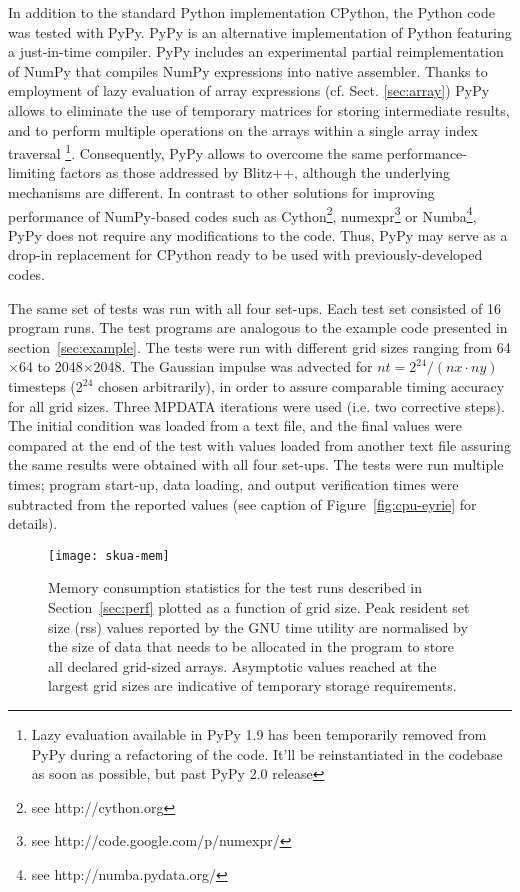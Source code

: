 \documentclass[final,5p,times,twocolumn]{elsarticle}
\newcommand{\url}[1]{{#1}}
\begin{document}
  In addition to the standard Python implementation CPython,
    the Python code was tested with PyPy.
  PyPy is an alternative implementation of Python featuring a just-in-time compiler. 
  PyPy includes an experimental partial reimplementation of NumPy that compiles NumPy expressions into native assembler.
  Thanks to employment of lazy evaluation of array expressions (cf. Sect. \ref{sec:array})
    PyPy allows to eliminate the use of temporary matrices for storing intermediate results,
    and to perform multiple operations on the arrays within a single array index traversal
    \footnote{Lazy evaluation available in PyPy 1.9 has been temporarily removed from PyPy during a refactoring of
      the code. It'll be reinstantiated in the codebase as soon as possible, but past PyPy 2.0 release}.
  Consequently, PyPy allows to overcome the same performance-limiting factors as those addressed by Blitz++, although 
    the underlying mechanisms are different.
  In contrast to other solutions for improving performance of NumPy-based codes such as
    Cython\footnote{see \url{http://cython.org}}, 
    numexpr\footnote{see \url{http://code.google.com/p/numexpr/}} or 
    Numba\footnote{see \url{http://numba.pydata.org/}}, 
    PyPy does not require any modifications to the code.
  Thus, PyPy may serve as a drop-in replacement for CPython ready to be used with 
    previously-developed codes.
  
  The same set of tests was run with all four set-ups.
  Each test set consisted of 16 program runs.
  The test programs are analogous to the example code presented in section~\ref{sec:example}.
  The tests were run with different grid sizes ranging from 64$\times$64 to 2048$\times$2048.
  The Gaussian impulse was advected for $nt=2^{24}/(nx\cdot ny)$ timesteps ($2^{24}$ chosen arbitrarily), 
    in order to assure comparable timing accuracy for all grid sizes.
  Three MPDATA iterations were used (i.e. two corrective steps).
  The initial condition was loaded from a text file, and the final values were compared at the end of the test
    with values loaded from another text file assuring the same results were obtained with all four set-ups.
  The tests were run multiple times; program start-up, data loading, and output verification times were
    subtracted from the reported values (see caption of Figure~\ref{fig:cpu-eyrie} for details).

  \begin{figure}[t]
    \center
    \texttt{[image: skua-mem]}
    \caption{\label{fig:mem}
      Memory consumption statistics for the test runs described in Section~\ref{sec:perf}
        plotted as a function of grid size.
      Peak resident set size (rss) values reported by the GNU time utility are normalised by the size of
        data that needs to be allocated in the program to store all declared grid-sized arrays.
      Asymptotic values reached at the largest grid sizes are indicative 
        of temporary storage requirements.
    }
  \end{figure}
\end{document}
